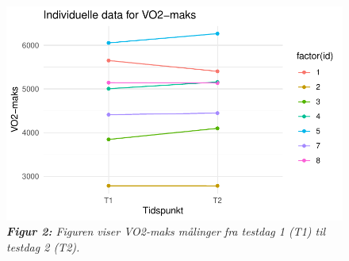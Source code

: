 \documentclass[
  letterpaper,
  DIV=11,
  numbers=noendperiod]{scrreprt}
\begin{document}
\begin{figure}

{\centering \includegraphics{01-reliabilitet_files/figure-pdf/unnamed-chunk-3-1.pdf}

}

\caption{\emph{\textbf{Figur 2:} Figuren viser VO2-maks målinger fra
testdag 1 (T1) til testdag 2 (T2).}}

\end{figure}
\end{document}
